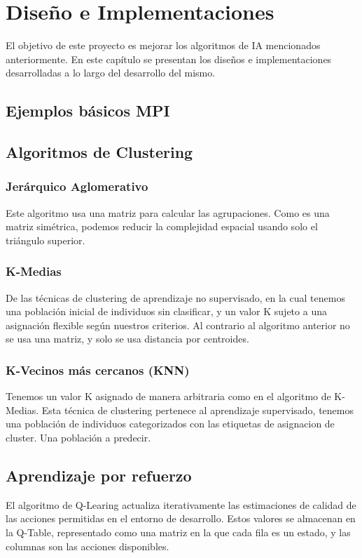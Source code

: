 \chapter{Diseño e Implementaciones}
	
	El objetivo de este proyecto es mejorar los algoritmos de IA mencionados anteriormente. En este capítulo se presentan los diseños e implementaciones desarrolladas a lo largo del desarrollo del mismo.
	
	\newpage %
	\section{Ejemplos básicos MPI}
	
	
	\newpage %
	\section{Algoritmos de Clustering}
	
		\subsection{Jerárquico Aglomerativo}
			Este algoritmo usa una matriz para calcular las agrupaciones. Como es una matriz simétrica, podemos reducir la complejidad espacial usando solo el triángulo superior.
			
		\subsection{K-Medias}
			De las técnicas de clustering de aprendizaje no supervisado, en la cual tenemos una población inicial de individuos sin clasificar, y un valor K sujeto a una asignación flexible según nuestros criterios. Al contrario al algoritmo anterior no se usa una matriz, y solo se usa distancia por centroides.
			
		\subsection{K-Vecinos más cercanos (KNN)}
			Tenemos un valor K  asignado de manera arbitraria como en el algoritmo de K-Medias. Esta técnica de clustering pertenece al aprendizaje supervisado, tenemos una población de individuos categorizados con las etiquetas de asignacion de cluster. Una población a predecir.
			
	
	
	\newpage %
	\section{Aprendizaje por refuerzo}
		El algoritmo de Q-Learing actualiza iterativamente las estimaciones de calidad de las acciones permitidas en el entorno de desarrollo. Estos valores se almacenan en la Q-Table, representado como una matriz en la que cada fila es un estado, y las columnas son las acciones disponibles.
		
